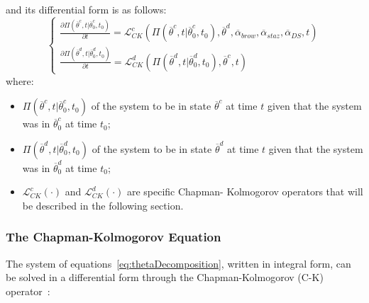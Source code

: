 and its differential form is as follows:
\begin{equation}
\label{eq:chapKolmogDiffFormContDisct}
\left\{\begin{matrix}
\frac{\partial \Pi \left (\overline{\theta}^{c},t|\overline{\theta}_{0}^{c},t_{0}  
\right ) }{\partial t} = \mathcal{L}_{CK}^{c}  \left (     \Pi \left 
(\overline{\theta}^{c},t|\overline{\theta}_{0}^{c},t_{0} \right ), 
\overline{\theta}^{d},\overline{\alpha}_{brow},\overline{\alpha}_{staz},
\overline{\alpha}_{DS},t  \right )
\\ 
\frac{\partial \Pi \left (\overline{\theta}^{d},t|\overline{\theta}_{0}^{d},t_{0}  
\right ) }{\partial t} = \mathcal{L}_{CK}^{d}  \left (     \Pi \left 
(\overline{\theta}^{d},t|\overline{\theta}_{0}^{d},t_{0} \right ), 
\overline{\theta}^{c},t  \right )
\end{matrix}\right.
\end{equation}
where:
\begin{itemize}
 \item  $\Pi \left (\overline{\theta}^{c},t|\overline{\theta}_{0}^{c},t_{0} \right 
 )$ of the system to be in state $\overline{\theta}^{c}$ at time $t$ given that 
 the system was in $\overline{\theta}^{c}_{0}$ at time $t_{0}$;
 \item $\Pi \left (\overline{\theta}^{d},t|\overline{\theta}_{0}^{d},t_{0} \right 
 )$ of the system to be in state $\overline{\theta}^{d}$ at time $t$ given 
 that the system was in $\overline{\theta}^{d}_{0}$ at time $t_{0}$;
 \item $\mathcal{L}_{CK}^{c} \left ( \cdot  \right )$ and 
 $\mathcal{L}_{CK}^{d} \left ( \cdot  \right )$  are specific Chapman-
 Kolmogorov operators that will be described in the following section.
\end{itemize}
%
%
%
%
%
\subsubsection{The Chapman-Kolmogorov Equation}
\label{sec:ChapmanKolmogorov }
The system of equations~\ref{eq:thetaDecomposition}, written in integral 
form, can be solved in a differential form through the Chapman-Kolmogorov (C-K) 
operator~\cite{ProbReactoDynamicsDevooght}:

